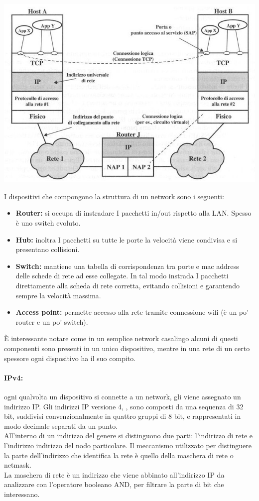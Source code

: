 \documentclass[a4paper]{report}
\begin{document}
\begin{center}\includegraphics[scale=0.5]{tcpip2.png}\end{center}
I dispositivi che compongono la struttura di un network sono i seguenti:
\begin{itemize}
\item \textbf{Router:} si occupa di instradare I pacchetti in/out rispetto alla
LAN. Spesso è uno switch evoluto.
\item \textbf{Hub:} inoltra I pacchetti su tutte le porte la velocità viene
condivisa e si presentano collisioni.
\item \textbf{Switch:} mantiene una tabella di corrispondenza tra porte e mac
address delle schede di rete ad esse collegate. In tal modo
instrada I pacchetti direttamente alla scheda di rete corretta,
evitando collisioni e garantendo sempre la velocità massima.
\item \textbf{Access point:} permette accesso alla rete tramite connessione
wifi (è un po' router e un po' switch).
\end{itemize}
È interessante notare come in un semplice network casalingo alcuni di questi componenti sono presenti in un unico dispositivo, mentre in una rete di un certo spessore ogni dispositivo ha il suo compito.\\
\paragraph{IPv4:} ogni qualvolta un dispositivo si connette a un network, gli viene assegnato un indirizzo IP. Gli indirizzi IP versione 4, , sono composti da una sequenza
di 32 bit, suddivisi convenzionalmente in quattro gruppi di 8
bit, e rappresentati in modo decimale separati da un punto.\\
All'interno di un indirizzo del genere si distinguono due parti:
l'indirizzo di rete e l'indirizzo indirizzo del nodo particolare.
Il meccanismo utilizzato per distinguere la parte dell'indirizzo
che identifica la rete è quello della maschera di rete o
netmask.\\
La maschera di rete è un indirizzo che viene abbinato
all'indirizzo IP da analizzare con l'operatore booleano AND,
per filtrare la parte di bit che interessano.\\
\end{document}
